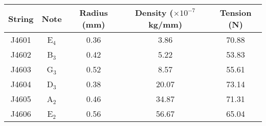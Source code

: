 \begin{tabular}{ccccc}
\toprule
String &    Note &  Radius (mm) &  Density ($\times 10^{-7}$ kg/mm) &  Tension (N) \\
\midrule
 J4601 & E$_{4}$ &         0.36 &                              3.86 &        70.88 \\
 J4602 & B$_{3}$ &         0.42 &                              5.22 &        53.83 \\
 J4603 & G$_{3}$ &         0.52 &                              8.57 &        55.61 \\
 J4604 & D$_{3}$ &         0.38 &                             20.07 &        73.14 \\
 J4605 & A$_{2}$ &         0.46 &                             34.87 &        71.31 \\
 J4606 & E$_{2}$ &         0.56 &                             56.67 &        65.04 \\
\bottomrule
\end{tabular}

